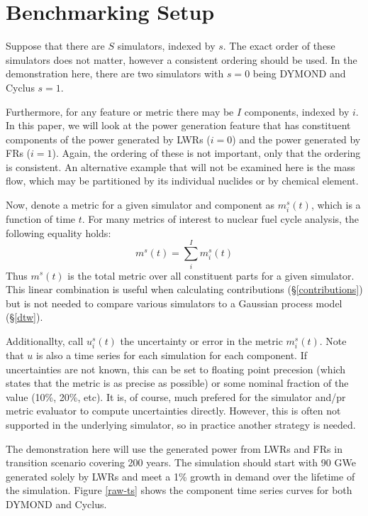 \section{Benchmarking Setup}
\label{setup}

Suppose that there are $S$ simulators, indexed by $s$. The exact order 
of these simulators does not matter, however a consistent ordering should
be used. In the demonstration here, there are two simulators with $s=0$
being DYMOND and Cyclus $s=1$.

Furthermore, for any feature or metric there may be $I$ components, 
indexed by $i$. In this paper, we will look at the power generation feature
that has constituent components of the power generated by LWRs ($i=0$) and
the power generated by FRs ($i=1$).  Again, the ordering of these is not 
important, only that the ordering is consistent. An alternative example
that will not be examined here is the mass flow, which may be partitioned 
by its individual nuclides or by chemical element.

Now, denote a metric for a given simulator and component as 
$m_i^s(t)$, which is a function of time $t$. For many metrics of interest 
to nuclear fuel cycle analysis, the following equality holds:
\begin{equation}
m^s(t) = \sum_i^I m_i^s(t)
\end{equation}
Thus $m^s(t)$ is the total metric over all constituent parts for a given 
simulator. This linear combination is useful when calculating contributions
(\S \ref{contributions}) but is not needed to compare various simulators
to a Gaussian process model (\S \ref{dtw}).

Additionallty, call $u_i^s(t)$ the uncertainty or error in the metric 
$m_i^s(t)$. Note that $u$ is also a time series for each simulation for 
each component. If uncertainties are not known, this can be set to floating
point precesion (which states that the metric is as precise as possible) or
some nominal fraction of the value (10\%, 20\%, etc). It is, of course, 
much prefered for the simulator and/pr metric evaluator to compute 
uncertainties directly. However, this is often not supported in the underlying
simulator, so in practice another strategy is needed.  

The demonstration here will use the generated power from LWRs and FRs in 
transition scenario covering 200 years. The simulation should start with
90 GWe generated solely by LWRs and meet a 1\% growth in demand over the 
lifetime of the simulation. Figure \ref{raw-ts} shows the component time 
series curves for both DYMOND and Cyclus.